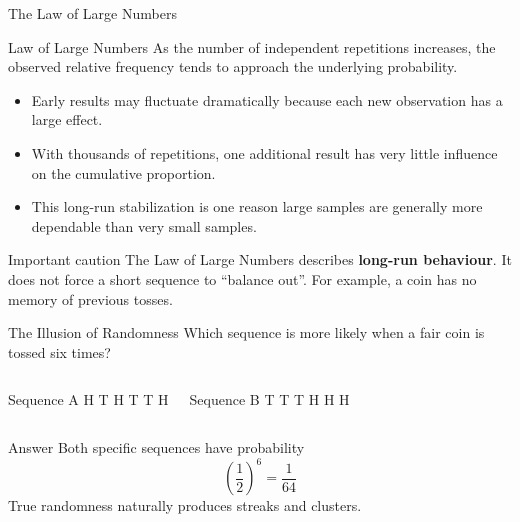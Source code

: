 \documentclass[aspectratio=169]{beamer}
\begin{document}
\begin{frame}{The Law of Large Numbers}
\begin{block}{Law of Large Numbers}
As the number of independent repetitions increases, the observed relative frequency tends to approach the underlying probability.
\end{block}

\begin{itemize}
	\item Early results may fluctuate dramatically because each new observation has a large effect.
	\item With thousands of repetitions, one additional result has very little influence on the cumulative proportion.
	\item This long-run stabilization is one reason large samples are generally more dependable than very small samples.
\end{itemize}

\begin{alertblock}{Important caution}
The Law of Large Numbers describes \textbf{long-run behaviour}. It does not force a short sequence to ``balance out''. For example, a coin has no memory of previous tosses.
\end{alertblock}
\end{frame}

\begin{frame}{The Illusion of Randomness}
Which sequence is more likely when a fair coin is tossed six times?
\vspace{0.4cm}
\begin{columns}[T,onlytextwidth]
\begin{block}{Sequence A}
\centering
\Large H T H T T H
\end{block}
\begin{block}{Sequence B}
\centering
\Large T T T H H H
\end{block}
\end{columns}

\pause
\vspace{0.4cm}
\begin{alertblock}{Answer}
Both specific sequences have probability
$$\left(\frac12\right)^6=\frac1{64}$$
True randomness naturally produces streaks and clusters.
\end{alertblock}
\end{frame}
\end{document}
